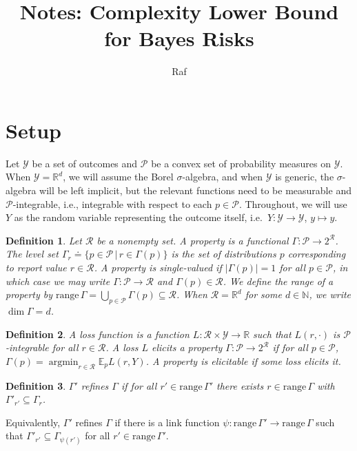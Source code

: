 \documentclass[11pt]{article}
\newtheorem{definition}{Definition}
\newcommand{\Comments}{1}
\newcommand{\mynote}[2]{\ifnum\Comments=1\textcolor{#1}{#2}\fi}
\newcommand{\raf}[1]{\mynote{darkgreen}{[RF: #1]}}
\newcommand{\E}{\mathbb{E}}
\newcommand{\N}{\mathbb{N}}
\renewcommand{\P}{\mathcal{P}}
\newcommand{\R}{\mathcal{R}}
\newcommand{\Y}{\mathcal{Y}}
\newcommand{\defeq}{\doteq}
\def\reals{\mathbb{R}}
\newcommand{\argmin}{\mathop{\mathrm{argmin}}}
\newcommand{\range}{\mathrm{range}\,}
\renewcommand{\Comments}{1}
\begin{document}
\title{Notes: Complexity Lower Bound for Bayes Risks}

\author{Raf}

\maketitle

\section{Setup}
\label{sec:elic-complex-setting}

Let $\Y$ be a set of outcomes and $\P$ be a convex set of probability measures on $\Y$.
When $\Y = \reals^d$, we will assume the Borel $\sigma$-algebra, and when $\Y$ is generic, the $\sigma$-algebra will be left implicit, but the relevant functions need to be measurable and $\P$-integrable, i.e., integrable with respect to each $p \in \P$.
Throughout, we will use $Y$ as the random variable representing the outcome itself, i.e.\ $Y:\Y\to\Y$, $y\mapsto y$.

\begin{definition}
  \label{def:property}
  Let $\R$ be a nonempty set.
  A \emph{property} is a functional $\Gamma : \P \to 2^\R$.
  The \emph{level set} $\Gamma_r \defeq \{p\in \P \,|\, r\in\Gamma(p)\}$ is the set of distributions $p$ corresponding to report value $r\in\R$.
  A property is \emph{single-valued} if $|\Gamma(p)|=1$ for all $p\in\P$, in which case we may write $\Gamma:\P\to\R$ and $\Gamma(p) \in \R$.
  We define the \emph{range} of a property by $\range \Gamma = \bigcup_{p\in\P} \Gamma(p) \subseteq \R$.
  When $\R=\reals^d$ for some $d\in\N$, we write $\dim\Gamma = d$.
\end{definition}

\begin{definition}
  \label{def:loss-elicits}
  A \emph{loss function} is a function $L:\R\times\Y\to\reals$ such that $L(r,\cdot)$ is $\P$-integrable for all $r\in\R$.
  A loss $L$ \emph{elicits} a property $\Gamma:\P\to 2^\R$ if for all $p\in\P$,
  $\Gamma(p) = \argmin_{r\in\R} \E_pL(r,Y)$.
  A property is \emph{elicitable} if some loss elicits it.
\end{definition}

\begin{definition}
  \label{def:refine}
  $\Gamma'$ \emph{refines} $\Gamma$ if for all $r'\in\range\Gamma'$ there exists $r\in\range\Gamma$ with $\Gamma'_{r'} \subseteq \Gamma_r$.
\end{definition}
Equivalently, $\Gamma'$ refines $\Gamma$ if there is a link function $\psi:\range\Gamma'\to\range\Gamma$ such that $\Gamma'_{r'} \subseteq \Gamma_{\psi(r')}$ for all $r'\in\range\Gamma'$.
\end{document}
